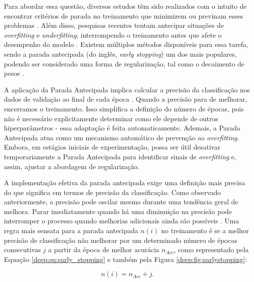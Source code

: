 Para abordar essa questão, diversos estudos têm sido realizados com o intuito de encontrar critérios de parada no treinamento que minimizem ou previnam esses problemas \citep{Prechelt1998AutomaticCriteria}. Além disso, pesquisas recentes tentam antecipar situações de \textit{overfitting} e \textit{underfitting}, interrompendo o treinamento antes que afete o desempenho do modelo \citep{VilaresFerro2023EarlyNetworks}. Existem múltiplos métodos disponíveis para essa tarefa, sendo a parada antecipada (do inglês, \textit{early stopping}) um dos mais populares, podendo ser considerado uma forma de regularização, tal como o decaimento de pesos \citep{VilaresFerro2023EarlyNetworks}.

A aplicação da Parada Antecipada implica calcular a precisão da classificação nos dados de validação ao final de cada época \citep{Prechelt1998AutomaticCriteria}. Quando a precisão para de melhorar, encerramos o treinamento. Isso simplifica a definição do número de épocas, pois não é necessário explicitamente determinar como ele depende de outros hiperparâmetros - essa adaptação é feita automaticamente. Ademais, a Parada Antecipada atua como um mecanismo automático de prevenção ao \textit{overfitting}. Embora, em estágios iniciais de experimentação, possa ser útil desativar temporariamente a Parada Antecipada para identificar sinais de \textit{overfitting} e, assim, ajustar a abordagem de regularização.

A implementação efetiva da parada antecipada exige uma definição mais precisa do que significa  em termos de precisão da classificação. Como observado anteriormente, a precisão pode oscilar mesmo durante uma tendência geral de melhora. Parar imediatamente quando há uma diminuição na precisão pode interromper o processo quando melhorias adicionais ainda são possíveis \citep{Prechelt1998EarlyWhen}. Uma regra mais sensata para a parada antecipada $n(i)$ no treinamento é se a melhor precisão de classificação não melhorar por um determinado número de épocas consecutivas $j$ a partir da época de melhor acurácia $n_{Acc}$, como representado pela Equação \ref{deep:eq:early_stopping} e também pela Figura \ref{deep:fig:earlystopping}:

\begin{equation}
    \label{deep:eq:early_stopping}
    n(i) = n_{Acc} + j.
\end{equation}


